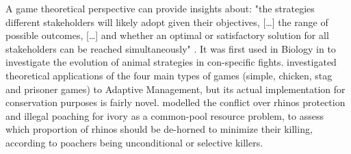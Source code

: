 \documentclass[12pt,a4paper]{article}
\begin{document}
A game theoretical perspective can provide insights about: "the strategies different stakeholders will likely adopt given their objectives, [\dots] the range of possible outcomes, [\dots] and whether an optimal or satisfactory solution for all stakeholders can be reached simultaneously" \citep{COLYVAN20111246}.
It was first used in Biology in \cite{maynard1973logic} to investigate the evolution of animal strategies in con-specific fights.
\cite{COLYVAN20111246} investigated theoretical applications of the four main types of games (simple, chicken, stag and prisoner games) to Adaptive Management, but its actual implementation for conservation purposes is fairly novel. %
\cite{glynatsi2018evolutionary} modelled the conflict over rhinos protection and illegal poaching for ivory as a common-pool resource problem, to assess which proportion of rhinos should be de-horned to minimize their killing, according to poachers being unconditional or selective killers. %
\end{document}
